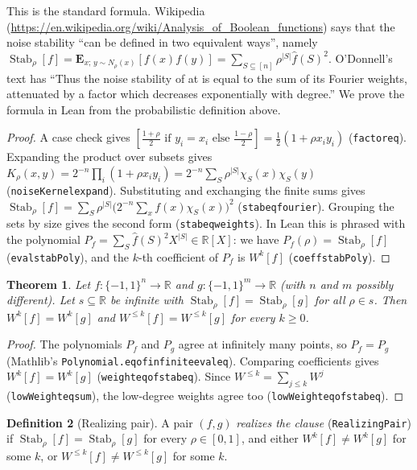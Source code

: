 \documentclass[11pt]{article}
\newtheorem{theorem}{Theorem}
\theoremstyle{definition}
\newtheorem{definition}[theorem]{Definition}
\theoremstyle{remark}
\renewcommand{\_}{\oldus\allowbreak}
\newcommand{\Stab}{\operatorname{Stab}}
\begin{document}
This is the standard formula. Wikipedia
(\url{https://en.wikipedia.org/wiki/Analysis_of_Boolean_functions}) says that the noise stability
``can be defined in two equivalent ways'', namely
$\Stab_\rho[f]=\mathbf{E}_{x;\,y\sim N_\rho(x)}[f(x)f(y)]=\sum_{S\subseteq[n]}\rho^{|S|}\hat f(S)^2$.
O'Donnell's text has ``Thus the noise stability of at is equal to the sum of its Fourier weights,
attenuated by a factor which decreases exponentially with degree.'' We prove the formula in Lean
from the probabilistic definition above.

\begin{proof}
A case check gives
$[\tfrac{1+\rho}{2}\text{ if }y_i=x_i\text{ else }\tfrac{1-\rho}{2}]=\tfrac12(1+\rho x_iy_i)$
(\texttt{factor\_eq}). Expanding the product over subsets gives
$K_\rho(x,y)=2^{-n}\prod_i(1+\rho x_iy_i)=2^{-n}\sum_S\rho^{|S|}\chi_S(x)\chi_S(y)$
(\texttt{noiseKernel\_expand}). Substituting and exchanging the finite sums gives
$\Stab_\rho[f]=\sum_S\rho^{|S|}\bigl(2^{-n}\sum_xf(x)\chi_S(x)\bigr)^2$
(\texttt{stab\_eq\_fourier}). Grouping the sets by size gives the second form
(\texttt{stab\_eq\_weights}). In Lean this is phrased with the polynomial
$P_f=\sum_S\hat f(S)^2X^{|S|}\in\mathbb{R}[X]$: we have $P_f(\rho)=\Stab_\rho[f]$
(\texttt{eval\_stabPoly}), and the $k$-th coefficient of $P_f$ is $W^k[f]$
(\texttt{coeff\_stabPoly}).
\end{proof}

\begin{theorem}\label{thm:main}
Let $f\colon\{-1,1\}^n\to\mathbb{R}$ and $g\colon\{-1,1\}^m\to\mathbb{R}$ (with $n$ and $m$
possibly different). Let $s\subseteq\mathbb{R}$ be infinite with $\Stab_\rho[f]=\Stab_\rho[g]$ for all
$\rho\in s$. Then $W^k[f]=W^k[g]$ and $W^{\le k}[f]=W^{\le k}[g]$ for every $k\ge0$.
\end{theorem}

\begin{proof}
The polynomials $P_f$ and $P_g$ agree at infinitely many points, so $P_f=P_g$ (Mathlib's
\texttt{Polynomial.eq\_of\_infinite\_eval\_eq}). Comparing coefficients gives $W^k[f]=W^k[g]$
(\texttt{weight\_eq\_of\_stab\_eq}). Since $W^{\le k}=\sum_{j\le k}W^j$
(\texttt{lowWeight\_eq\_sum}), the low-degree weights agree too
(\texttt{lowWeight\_eq\_of\_stab\_eq}).
\end{proof}

\begin{definition}[Realizing pair]
A pair $(f,g)$ \emph{realizes the clause} (\texttt{RealizingPair}) if $\Stab_\rho[f]=\Stab_\rho[g]$
for every $\rho\in[0,1]$, and either $W^k[f]\ne W^k[g]$ for some $k$, or
$W^{\le k}[f]\ne W^{\le k}[g]$ for some $k$.
\end{definition}
\end{document}
